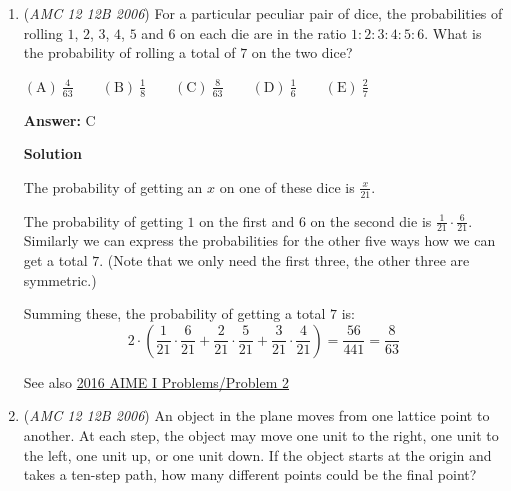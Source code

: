 \begin{enumerate}
 The apothem is thus $\frac{1}{2}\cdot\frac{5\sqrt{6}}{3}\cdot\sqrt{3} = \frac{5\sqrt{2}}{2}$, yielding an area of $\frac{1}{2}\cdot10\sqrt{6}\cdot\frac{5\sqrt{2}}{2}=25\sqrt{3} \implies \mathrm{(C)}$.

 



\textbf{Solution 2}

Solution 2 has the exact same solution as Solution 1 denoted, but instead, we do not need to know the value of the apothem. We could just apply s, which is the side length in this problem, $\frac{5\sqrt{6}}{3}$ into the hexagon area formula, $\frac{3  (\frac{5\sqrt{6}}{3})^2 \sqrt{3} }{2}=25\sqrt{3} \implies \mathrm{(C)}$



	\item (\textit{AMC 12 12B 2006}) For a particular peculiar pair of dice, the probabilities of rolling $1$, $2$, $3$, $4$, $5$ and $6$ on each die are in the ratio $1:2:3:4:5:6$. What is the probability of rolling a total of $7$ on the two dice?


 $\mathrm{(A)}\ \frac 4{63} \qquad \mathrm{(B)}\ \frac 18  \qquad \mathrm{(C)}\ \frac 8{63} \qquad \mathrm{(D)}\ \frac 16 \qquad \mathrm{(E)}\ \frac 27$

 \textbf{Answer: }C



\textbf{Solution}

The probability of getting an $x$ on one of these dice is $\frac{x}{21}$.

 The probability of getting $1$ on the first and $6$ on the second die is $\frac 1{21}\cdot\frac 6{21}$. Similarly we can express the probabilities for the other five ways how we can get a total $7$. (Note that we only need the first three, the other three are symmetric.)

 Summing these, the probability of getting a total $7$ is:
 \[2\cdot\left( \frac 1{21}\cdot\frac 6{21} + \frac 2{21}\cdot\frac 5{21} + \frac 3{21}\cdot\frac 4{21} \right) =  \frac{56}{441} = \boxed{\frac{8}{63}}\]

 See also \href{https://artofproblemsolving.com/wiki/index.php?title=2016\_AIME\_I\_Problems/Problem\_2}{2016 AIME I Problems/Problem 2}

 


	\item (\textit{AMC 12 12B 2006}) An object in the plane moves from one lattice point to another. At each step, the object may move one unit to the right, one unit to the left, one unit up, or one unit down. If the object starts at the origin and takes a ten-step path, how many different points could be the final point?



\end{enumerate}
